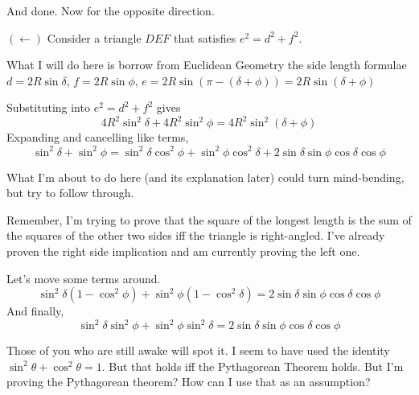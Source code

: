 And done. Now for the opposite direction.
\begin{smrg}
$(\leftarrow)$ Consider a triangle $DEF$ that satisfies $e^2 = d^2 + f^2$.
\begin{center}
\end{center}
\end{smrg}
What I will do here is borrow from Euclidean Geometry the side length formulae $d = 2R\sin\delta$, $f = 2R\sin\phi$, $e = 2R\sin(\pi - (\delta + \phi)) = 2R\sin(\delta + \phi)$
\begin{smrg}
Substituting into $e^2 = d^2 + f^2$ gives
\[
4R^2\sin^2\delta + 4R^2\sin^2\phi = 4R^2\sin^2(\delta + \phi)
\]
Expanding and cancelling like terms,
\[
\sin^2\delta + \sin^2\phi = \sin^2\delta\cos^2\phi+\sin^2\phi\cos^2\delta +2\sin\delta\sin\phi\cos\delta\cos\phi
\]
\end{smrg}
What I'm about to do here (and its explanation later) could turn mind-bending, but try to follow through.

Remember, I'm trying to prove that the square of the longest length is the sum of the squares of the other two sides iff the triangle is right-angled. I've already proven the right side implication and am currently proving the left one.
\begin{smrg}
Let's move some terms around.
\[
\sin^2\delta(1-\cos^2\phi) + \sin^2\phi(1-\cos^2\delta) = 2\sin\delta\sin\phi\cos\delta\cos\phi
\]
And finally,
\[
\sin^2\delta\sin^2\phi + \sin^2\phi\sin^2\delta = 2\sin\delta\sin\phi\cos\delta\cos\phi
\]
\end{smrg}
Those of you who are still awake will spot it. I seem to have used the identity $\sin^2\theta + \cos^2\theta = 1$. But that holds iff the Pythagorean Theorem holds. But I'm proving the Pythagorean theorem? How can I use that as an assumption?

